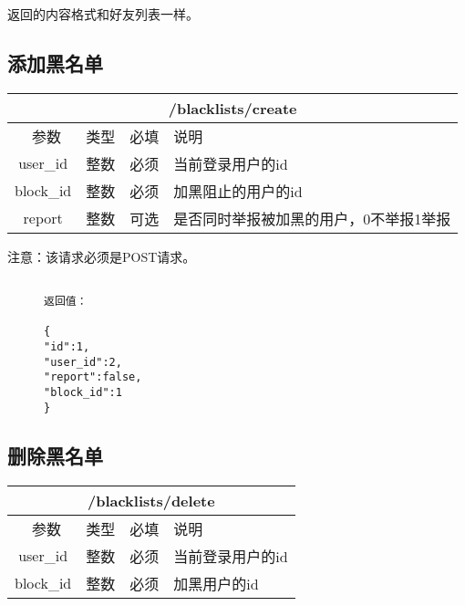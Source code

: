 \documentclass[cs4size]{ctexartutf8}
\begin{document}
返回的内容格式和好友列表一样。


\subsection{添加黑名单}

\begin{table}[H]
   \begin{center}
\begin{tabular}{|c|c|c|p{12cm}|}
\hline
\multicolumn{4}{|c|}{/blacklists/create} \\
\hline\hline
 \  参数  & 类型 & 必填 &  说明  \\
\hline
 user\_id  & 整数 & 必须 &  当前登录用户的id\\
\hline
 block\_id  & 整数 & 必须 &  加黑阻止的用户的id\\
 \hline
 report  & 整数 & 可选 &  是否同时举报被加黑的用户，0不举报1举报\\
\hline
\end{tabular}
   \end{center}
\end{table}

注意：该请求必须是POST请求。

\begin{figure}[H]
\begin{verbatim}

返回值：

{
"id":1,
"user_id":2,
"report":false,
"block_id":1
}

\end{verbatim}
\end{figure}



\subsection{删除黑名单}

\begin{table}[H]
   \begin{center}
\begin{tabular}{|c|c|c|p{12cm}|}
\hline
\multicolumn{4}{|c|}{/blacklists/delete} \\
\hline\hline
 \  参数  & 类型 & 必填 &  说明  \\
\hline
 user\_id  & 整数 & 必须 &  当前登录用户的id\\
\hline
 block\_id  & 整数 & 必须 &  加黑用户的id\\
\hline
\end{tabular}
   \end{center}
\end{table}
\end{document}
